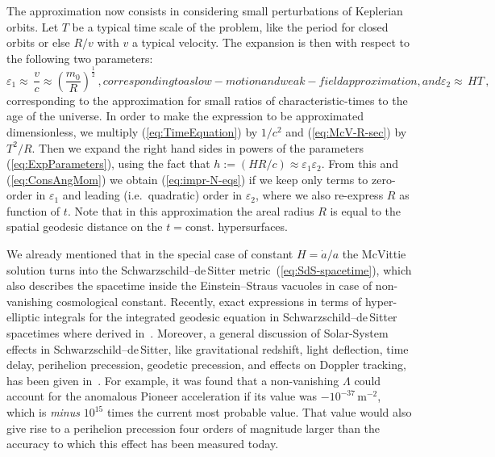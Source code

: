 \documentclass
[rmp,aps,twocolumn,showpacs,preprintnumbers,amsmath,amssymb]{revtex4}
\theoremstyle{plain}
\theoremstyle{definition}
\theoremstyle{remark}
\newcommand{\sss}{\scriptscriptstyle}
\begin{document}
The approximation now consists in considering small perturbations of 
Keplerian orbits. Let $T$ be a typical time scale of the problem, like 
the period for closed orbits or else $R/v$ with $v$ a typical velocity. 
The expansion is then with respect to the following two parameters: 
%
\begin{subequations}\label{eq:ExpParameters}
\begin{equation}\label{eq:ExpParameters1}
  \varepsilon_{\sss 1} 
  \approx\, \frac{v}{c} 
  \approx  \left(\frac{m_0}{R}\right)^{\frac{1}{2}}\,,
\end{equation}
%
corresponding to a slow-motion and weak-field approximation, and 
%
\begin{equation}\label{eq:ExpParameters2}
  \varepsilon_{\sss 2} \approx\, HT\,,
\end{equation}
\end{subequations}
%
corresponding to the approximation for small ratios of characteristic-times 
to the age of the universe. In order to make the expression to be 
approximated dimensionless, we multiply (\ref{eq:TimeEquation}) by 
$1/c^2$ and (\ref{eq:McV-R-sec}) by $T^2/R$. Then we expand the right 
hand sides in powers of the parameters (\ref{eq:ExpParameters}), using 
the fact that $h:=(HR/c)\approx\varepsilon_{\sss 1}\varepsilon_{\sss 2}$. 
From this and (\ref{eq:ConsAngMom}) we obtain (\ref{eq:impr-N-eqs}) if we 
keep only terms to zero-order in $\varepsilon_{\sss 1}$ and leading 
(i.e.~quadratic) order in $\varepsilon_{\sss 2}$, where we also 
re-express $R$ as function of $t$. Note that in this approximation 
the areal radius $R$ is equal to the spatial geodesic distance on 
the $t=\text{const.}$ hypersurfaces. 

We already mentioned that in the special case of constant $H=\dot a/a$
the McVittie solution turns into the Schwarzschild--de\,Sitter 
metric~(\ref{eq:SdS-spacetime}), which also describes the spacetime 
inside the Einstein--Straus vacuoles in case of non-vanishing 
cosmological constant. Recently, exact expressions in terms of 
hyper-elliptic integrals for the integrated geodesic equation in 
Schwarzschild--de\,Sitter spacetimes where derived 
in~\cite{Hackmann.Laemmerzahl:2008a,Hackmann.Laemmerzahl:2008b}. 
Moreover, a general discussion of Solar-System effects in 
Schwarzschild--de\,Sitter, like gravitational redshift, light 
deflection, time delay, perihelion precession, geodetic precession, 
and effects on Doppler tracking, has been given 
in~\cite{Kagramanova.etal:2006}. For example, it was found 
that a non-vanishing $\Lambda$ could account for the anomalous Pioneer 
acceleration if its value was $-10^{-37}\,\mathrm{m^{-2}}$, 
which is \emph{minus} $10^{15}$ times the current most probable 
value. That value would also give rise to a perihelion precession 
four orders of magnitude larger than the accuracy to which this effect 
has been measured today. 
\end{document}
